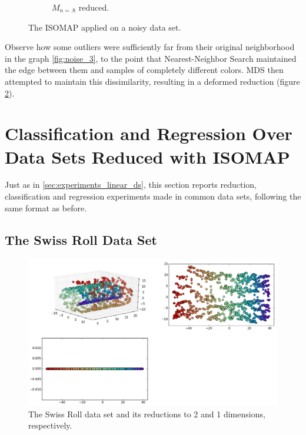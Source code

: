\documentclass[12pt]{report}
\begin{document}
\begin{description}
\begin{figure}[H]
\begin{subfigure}{.6\linewidth}
			\captionsetup{justification=centering}
			\caption{$M_{n=.8}$ reduced.}
			\label{fig:noise_2}
		\end{subfigure}
		\captionsetup{justification=centering}
		\caption{The ISOMAP applied on a noisy data set.}
	\end{figure}

	Observe how some outliers were sufficiently far from their original neighborhood in the graph \ref{fig:noise_3}, to the point that Nearest-Neighbor Search maintained the edge between them and samples of completely different colors. MDS then attempted to maintain this dissimilarity, resulting in a deformed reduction (figure \ref{fig:noise_2}).
\end{description}

\newpage
\section{Classification and Regression Over Data Sets Reduced with ISOMAP}

Just as in \ref{sec:experiments_linear_ds}, this section reports reduction, classification and regression experiments made in common data sets, following the same format as before.

\subsection{The Swiss Roll Data Set}

\begin{figure}[H]
	\centering
	\includegraphics[width=\linewidth]{experiments/iso_swiss}
	\captionsetup{justification=centering}
	\caption{The Swiss Roll data set and its reductions to 2 and 1 dimensions, respectively.}
\end{figure}
\end{document}

